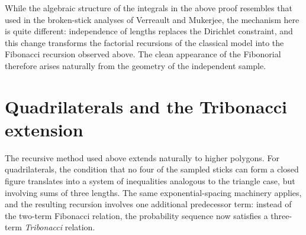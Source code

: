 \documentclass{amsart}
\begin{document}
While the algebraic structure of the integrals in the above proof resembles that used in the broken-stick analyses of Verreault and Mukerjee, the mechanism here is quite different: independence of lengths replaces the Dirichlet constraint, and this change transforms the factorial recursions of the classical model into the Fibonacci recursion observed above. The clean appearance of the Fibonorial therefore arises naturally from the geometry of the independent sample.

\section{Quadrilaterals and the Tribonacci extension}

The recursive method used above extends naturally to higher polygons. For quadrilaterals, the condition that no four of the sampled sticks can form a closed figure translates into a system of inequalities analogous to the triangle case, but involving sums of three lengths. The same exponential-spacing machinery applies, and the resulting recursion involves one additional predecessor term: instead of the two-term Fibonacci relation, the probability sequence now satisfies a three-term \emph{Tribonacci} relation.
\end{document}
